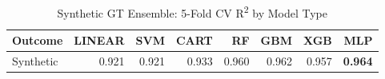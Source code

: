\begin{table}[ht]
\centering
\caption{Synthetic GT Ensemble: 5-Fold CV R\textsuperscript{2} by Model Type}
\begin{tabular}{lrrrrrrr}
\toprule
Outcome & LINEAR & SVM & CART & RF & GBM & XGB & MLP \\
\midrule
Synthetic & 0.921 & 0.921 & 0.933 & 0.960 & 0.962 & 0.957 & \textbf{0.964} \\
\bottomrule
\end{tabular}
\end{table}